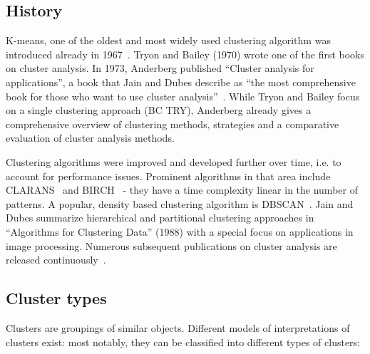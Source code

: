 \subsection{History}

K-means, one of the oldest and most widely used clustering algorithm was introduced already in 1967~\cite{MacQueen67kmeans, Meert06clustermaps}. Tryon and Bailey (1970) wrote one of the first books on cluster analysis. In 1973, Anderberg published ``Cluster analysis for applications'', a book that Jain and Dubes describe as ``the most comprehensive book for those who want to use cluster analysis''~\cite{Jain88clustering}.  While Tryon and Bailey focus on a single clustering approach (BC TRY), Anderberg already gives a comprehensive overview of clustering methods, strategies and a comparative evaluation of cluster analysis methods.

Clustering algorithms were improved and developed further over time, i.e. to account for performance issues. Prominent algorithms in that area include CLARANS~\cite{Ng94CLARANS} and BIRCH~\cite{Zhang96BIRCH} - they have a time complexity linear in the number of patterns. A popular, density based clustering algorithm is DBSCAN~\cite{Ester96DBSCAN}. Jain and Dubes summarize hierarchical and partitional clustering approaches in ``Algorithms for Clustering Data'' (1988) with a special focus on applications in image processing. Numerous subsequent publications on cluster analysis are released continuously~\cite{Jain99clusterreview}. 



\subsection{Cluster types}

Clusters are groupings of similar objects. Different models of interpretations of clusters exist: most notably, they can be classified into different types of clusters:

